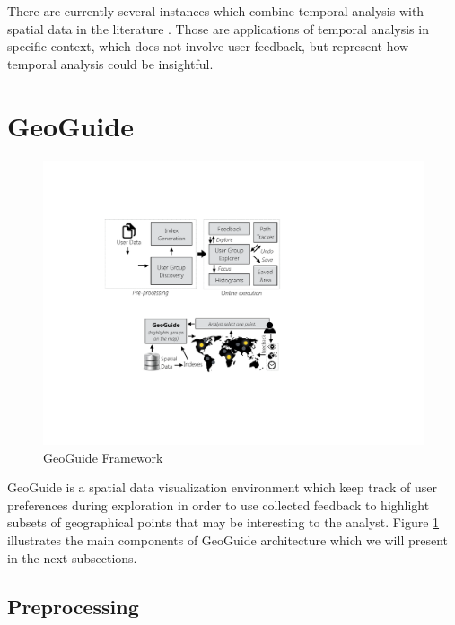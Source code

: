 There are currently several instances which combine temporal analysis with spatial data in the literature \cite{baculo2017,balahadia2017,chidean2018,ghahramani2018,kamath2013,lopestexeira2018,ma2017,mijovic2016,tomoki2010,nara2007,zhan2017,zheng2018}. Those are applications of temporal analysis in specific context, which does not involve user feedback, but represent how temporal analysis could be insightful.

\section{GeoGuide}

\begin{figure}[t]
  \centering
  \includegraphics[width=\columnwidth]{imagens/framework}
  \caption{GeoGuide Framework}
  \label{fig:framework}
  \vspace{-10pt}
\end{figure}

GeoGuide \cite{omidvarTehrani2017} is a spatial data visualization environment which keep track of user preferences during exploration in order to use collected feedback to highlight subsets of geographical points that may be interesting to the analyst. Figure \ref{fig:framework} illustrates the main components of GeoGuide architecture which we will present in the next subsections.

\subsection{Preprocessing}

